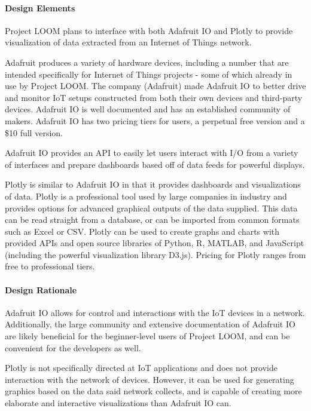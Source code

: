 \documentclass[onecolumn, draftclsnofoot,10pt, compsoc]{IEEEtran}
\begin{document}
\paragraph{Design Elements}
    Project LOOM plans to interface with both Adafruit IO and Plotly to provide visualization of data extracted from an Internet of Things network.

    Adafruit produces a variety of hardware devices, including a number that are intended specifically for Internet of Things projects - some of which already in use by Project LOOM. The company (Adafruit) made Adafruit IO to better drive and monitor IoT setups constructed from both their own devices and third-party devices. Adafruit IO is well documented and has an established community of makers. Adafruit IO has two pricing tiers for users, a perpetual free version and a \$10 full version.

    Adafruit IO provides an API to easily let users interact with I/O from a variety of interfaces and prepare dashboards based off of data feeds for powerful displays. \cite{adafruitio}

    Plotly is similar to Adafruit IO in that it provides dashboards and visualizations of data. Plotly is a professional tool used by large companies in industry and provides options for advanced graphical outputs of the data supplied. This data can be read straight from a database, or can be imported from common formats such as Excel or CSV. Plotly can be used to create graphs and charts with provided APIs and open source libraries of Python, R, MATLAB, and JavaScript (including the powerful visualization library D3.js). Pricing for Plotly ranges from free to professional tiers. \cite{plotly}

\paragraph{Design Rationale}
    Adafruit IO allows for control and interactions with the IoT devices in a network. Additionally, the large community and extensive documentation of Adafruit IO are likely beneficial for the beginner-level users of Project LOOM, and can be convenient for the developers as well.

    Plotly is not specifically directed at IoT applications and does not provide interaction with the network of devices. However, it can be used for generating graphics based on the data said network collects, and is capable of creating more elaborate and interactive visualizations than Adafruit IO can.
\end{document}
